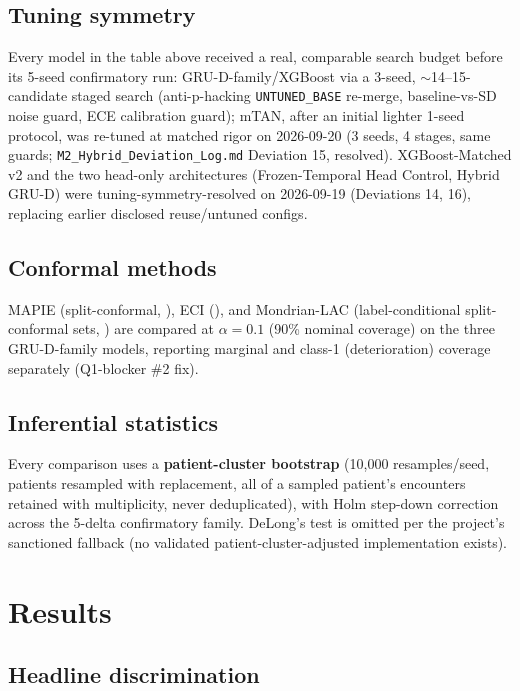 \documentclass[11pt]{article}
\begin{document}
\subsection{Tuning symmetry}
Every model in the table above received a real, comparable search budget before its 5-seed confirmatory run: GRU-D-family/XGBoost via a 3-seed, $\sim$14--15-candidate staged search (anti-p-hacking \texttt{UNTUNED\_BASE} re-merge, baseline-vs-SD noise guard, ECE calibration guard); mTAN, after an initial lighter 1-seed protocol, was re-tuned at matched rigor on 2026-09-20 (3 seeds, 4 stages, same guards; \texttt{M2\_Hybrid\_Deviation\_Log.md} Deviation 15, resolved). XGBoost-Matched v2 and the two head-only architectures (Frozen-Temporal Head Control, Hybrid GRU-D) were tuning-symmetry-resolved on 2026-09-19 (Deviations 14, 16), replacing earlier disclosed reuse/untuned configs.

\subsection{Conformal methods}
MAPIE (split-conformal, \cite{mapie}), ECI (\cite{wu2025error}), and Mondrian-LAC (label-conditional split-conformal sets, \cite{sadinle2019least}) are compared at $\alpha=0.1$ (90\% nominal coverage) on the three GRU-D-family models, reporting marginal and class-1 (deterioration) coverage separately (Q1-blocker \#2 fix).

\subsection{Inferential statistics}
Every comparison uses a \textbf{patient-cluster bootstrap} (10{,}000 resamples/seed, patients resampled with replacement, all of a sampled patient's encounters retained with multiplicity, never deduplicated), with Holm step-down correction across the 5-delta confirmatory family. DeLong's test is omitted per the project's sanctioned fallback (no validated patient-cluster-adjusted implementation exists).

\section{Results}
\label{sec:results}

\subsection{Headline discrimination}
\end{document}
